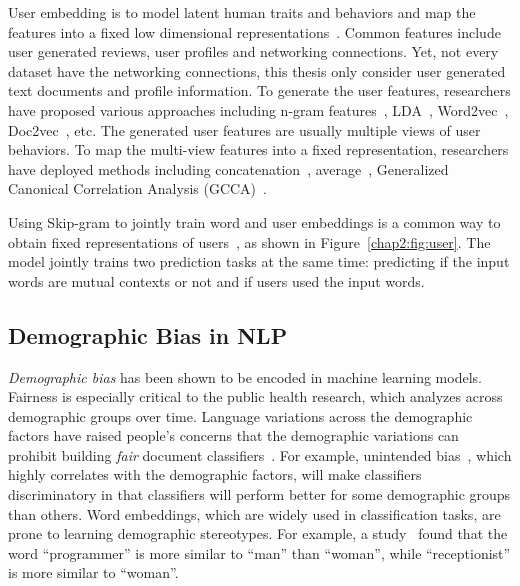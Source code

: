 User embedding is to model latent human traits and behaviors and map the features into a fixed low dimensional representations~\cite{pan2019social}. 
Common features include user generated reviews, user profiles and networking connections. 
Yet, not every dataset have the networking connections, this thesis only consider user generated text documents and profile information.
To generate the user features, researchers have proposed various approaches including n-gram features~\cite{benton2016learning}, LDA~\cite{zhang2015using, ding2017multi}, Word2vec~\cite{amir2016modelling, benton2016learning, amir2017quantifying, wu2018starspace}, Doc2vec~\cite{ding2017multi, ding2018predicting}, etc.
The generated user features are usually multiple views of user behaviors. 
To map the multi-view features into a fixed representation, researchers have deployed methods including concatenation~\cite{pennacchiotti2011machine}, average~\cite{ding2017multi}, Generalized Canonical Correlation Analysis (GCCA)~\cite{benton2016learning}.

Using Skip-gram to jointly train word and user embeddings is a common way to obtain fixed representations of users~\cite{amir2017quantifying, wu2018starspace}, as shown in Figure~\ref{chap2:fig:user}.
The model jointly trains two prediction tasks at the same time: predicting if the input words are mutual contexts or not and if users used the input words.


\subsection{Demographic Bias in NLP}

\textit{Demographic bias} has been shown to be encoded in machine learning models. 
Fairness is especially critical to the public health research, which analyzes across demographic groups over time. 
Language variations across the demographic factors have raised people's concerns that the demographic variations can prohibit building \textit{fair} document classifiers~\cite{sun2019mitigating, bender2018data}. 
For example, unintended bias~\cite{dixon2018measuring}, which highly correlates with the demographic factors, will make classifiers discriminatory in that classifiers will perform better for some demographic groups than others. 
Word embeddings, which are widely used in classification tasks, are prone to learning demographic stereotypes.
For example, a study~\cite{bolukbasi2016man} found that the word ``programmer'' is more similar to ``man'' than ``woman'', while ``receptionist'' is more similar to ``woman''.

